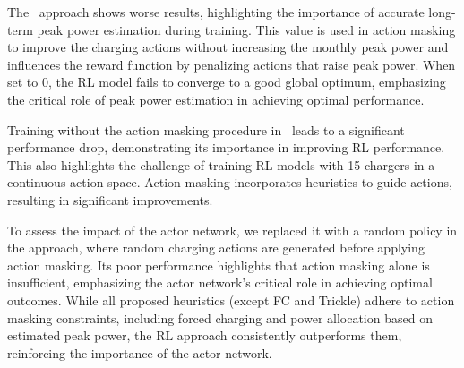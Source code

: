 The \rlnoe\  approach shows worse results, highlighting the importance of accurate long-term peak power estimation during training. This value is used in action masking to improve the charging actions without increasing the monthly peak power and influences the reward function by penalizing actions that raise peak power. When set to $0$, the RL model fails to converge to a good global optimum, emphasizing the critical role of peak power estimation in achieving optimal performance. 

Training without the action masking procedure in \rlnoa \ leads to a significant performance drop, demonstrating its importance in improving RL performance. This also highlights the challenge of training RL models with 15 chargers in a continuous action space. Action masking incorporates heuristics to guide actions, resulting in significant improvements.

To assess the impact of the actor network, we replaced it with a random policy in the \random approach, where random charging actions are generated before applying action masking. Its poor performance highlights that action masking alone is insufficient, emphasizing the actor network’s critical role in achieving optimal outcomes. While all proposed heuristics (except FC and Trickle) adhere to action masking constraints, including forced charging and power allocation based on estimated peak power, the RL approach consistently outperforms them, reinforcing the importance of the actor network.


